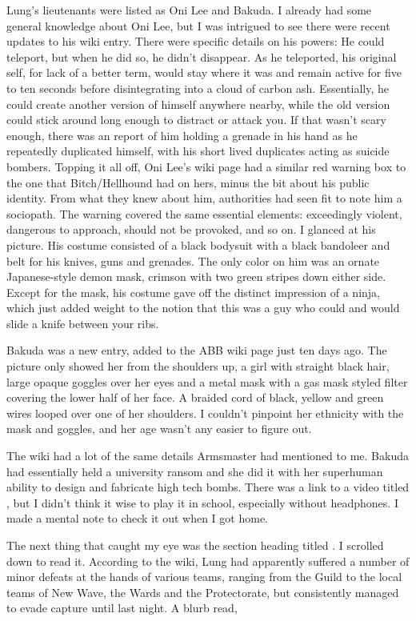 Lung's lieutenants were listed as Oni Lee and Bakuda. I already had some general knowledge about Oni Lee, but I was intrigued to see there were recent updates to his wiki entry. There were specific details on his powers: He could teleport, but when he did so, he didn't disappear. As he teleported, his original self, for lack of a better term, would stay where it was and remain active for five to ten seconds before disintegrating into a cloud of carbon ash. Essentially, he could create another version of himself anywhere nearby, while the old version could stick around long enough to distract or attack you. If that wasn't scary enough, there was an report of him holding a grenade in his hand as he repeatedly duplicated himself, with his short lived duplicates acting as suicide bombers. Topping it all off, Oni Lee's wiki page had a similar red warning box to the one that Bitch/Hellhound had on hers, minus the bit about his public identity. From what they knew about him, authorities had seen fit to note him a sociopath. The warning covered the same essential elements: exceedingly violent, dangerous to approach, should not be provoked, and so on. I glanced at his picture. His costume consisted of a black bodysuit with a black bandoleer and belt for his knives, guns and grenades. The only color on him was an ornate Japanese-style demon mask, crimson with two green stripes down either side. Except for the mask, his costume gave off the distinct impression of a ninja, which just added weight to the notion that this was a guy who could and would slide a knife between your ribs.

Bakuda was a new entry, added to the ABB wiki page just ten days ago. The picture only showed her from the shoulders up, a girl with straight black hair, large opaque goggles over her eyes and a metal mask with a gas mask styled filter covering the lower half of her face. A braided cord of black, yellow and green wires looped over one of her shoulders. I couldn't pinpoint her ethnicity with the mask and goggles, and her age wasn't any easier to figure out.

The wiki had a lot of the same details Armsmaster had mentioned to me. Bakuda had essentially held a university ransom and she did it with her superhuman ability to design and fabricate high tech bombs. There was a link to a video titled , but I didn't think it wise to play it in school, especially without headphones. I made a mental note to check it out when I got home.

The next thing that caught my eye was the section heading titled . I scrolled down to read it. According to the wiki, Lung had apparently suffered a number of minor defeats at the hands of various teams, ranging from the Guild to the local teams of New Wave, the Wards and the Protectorate, but consistently managed to evade capture until last night. A blurb read, 

